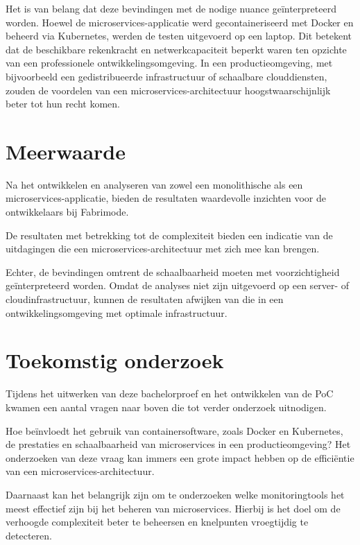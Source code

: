 Het is van belang dat deze bevindingen met de nodige nuance geïnterpreteerd worden. Hoewel de microservices-applicatie werd gecontaineriseerd met Docker en beheerd via Kubernetes, werden de testen uitgevoerd op een laptop. Dit betekent dat de beschikbare rekenkracht en netwerkcapaciteit beperkt waren ten opzichte van een professionele ontwikkelingsomgeving. In een productieomgeving, met bijvoorbeeld een gedistribueerde infrastructuur of schaalbare clouddiensten, zouden de voordelen van een microservices-architectuur hoogstwaarschijnlijk beter tot hun recht komen.

\section{Meerwaarde}

Na het ontwikkelen en analyseren van zowel een monolithische als een microservices-applicatie, bieden de resultaten waardevolle inzichten voor de ontwikkelaars bij Fabrimode.

De resultaten met betrekking tot de complexiteit bieden een indicatie van de uitdagingen die een microservices-architectuur met zich mee kan brengen.

Echter, de bevindingen omtrent de schaalbaarheid moeten met voorzichtigheid geïnterpreteerd worden. Omdat de analyses niet zijn uitgevoerd op een server- of cloudinfrastructuur, kunnen de resultaten afwijken van die in een ontwikkelingsomgeving met optimale infrastructuur.

\section{Toekomstig onderzoek}

Tijdens het uitwerken van deze bachelorproef en het ontwikkelen van de PoC kwamen een aantal vragen naar boven die tot verder onderzoek uitnodigen.

Hoe beïnvloedt het gebruik van containersoftware, zoals Docker en Kubernetes, de prestaties en schaalbaarheid van microservices in een productieomgeving? Het onderzoeken van deze vraag kan immers een grote impact hebben op de efficiëntie van een microservices-architectuur.

Daarnaast kan het belangrijk zijn om te onderzoeken welke monitoringtools het meest effectief zijn bij het beheren van microservices. Hierbij is het doel om de verhoogde complexiteit beter te beheersen en knelpunten vroegtijdig te detecteren.


